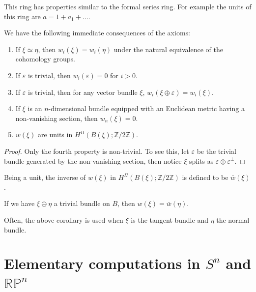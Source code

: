 	\begin{remark}
		This ring has properties similar to the formal series ring. For example the units of this ring are $a=1+a_1+\dots$. 
	\end{remark}

	We have the following immediate consequences of the axioms: 
	
	\begin{coro}
		\begin{enumerate}
			\item If $\xi\simeq\eta$, then $w_i(\xi)=w_i(\eta)$ under the natural equivalence of the cohomology groups. 
			\item If $\varepsilon$ is trivial, then $w_i(\varepsilon)=0$ for $i>0$. 
			\item If $\varepsilon$ is trivial, then for any vector bundle $\xi$, $w_i(\xi\oplus\varepsilon)=w_i(\xi)$. 
			\item If $\xi$ is an $n$-dimensional bundle equipped with an Euclidean metric having a non-vanishing section, then $w_n(\xi)=0$. 
			\item $w(\xi)$ are units in $H^\Pi(B(\xi);\mathbb{Z}/2\mathbb{Z})$. 
		\end{enumerate}
	\end{coro}
	\begin{proof}
		Only the fourth property is non-trivial. To see this, let $\varepsilon$ be the trivial bundle generated by the non-vanishing section, then notice $\xi$ splits as $\varepsilon\oplus\varepsilon^\bot$. 
	\end{proof}

	\begin{defn}
		Being a unit, the inverse of $w(\xi)$ in $H^\Pi(B(\xi);\mathbb{Z}/2\mathbb{Z})$ is defined to be $\bar{w}(\xi)$. 
	\end{defn}

	\begin{coro}
		If we have $\xi\oplus\eta$ a trivial bundle on $B$, then $w(\xi)=\bar{w}(\eta)$. 
	\end{coro}
	\begin{remark}
		Often, the above corollary is used when $\xi$ is the tangent bundle and $\eta$ the normal bundle. 
	\end{remark}

\section{Elementary computations in $S^n$ and $\mathbb{RP}^n$}

